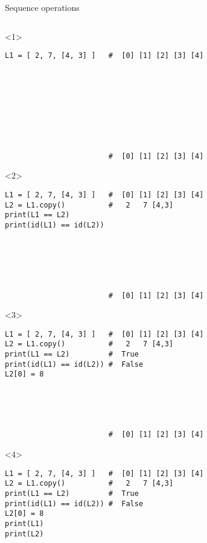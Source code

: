 \begin{frame}[fragile]{Sequence operations}

  \begin{center}

  \begin{columns}[onlytextwidth]
    \begin{column}{\textwidth}

      \begin{onlyenv}<1>
        \begin{lstlisting}[style=python,morekeywords={for, in, range, list}]
L1 = [ 2, 7, [4, 3] ]   #  [0] [1] [2] [3] [4]









                        #  [0] [1] [2] [3] [4] \end{lstlisting}
      \end{onlyenv}

      \begin{onlyenv}<2>
        \begin{lstlisting}[style=python,morekeywords={for, in, range, list}]
L1 = [ 2, 7, [4, 3] ]   #  [0] [1] [2] [3] [4]
L2 = L1.copy()          #   2   7 [4,3]
print(L1 == L2)
print(id(L1) == id(L2))






                        #  [0] [1] [2] [3] [4] \end{lstlisting}
      \end{onlyenv}

      \begin{onlyenv}<3>
        \begin{lstlisting}[style=python,morekeywords={for, in, range, list}]
L1 = [ 2, 7, [4, 3] ]   #  [0] [1] [2] [3] [4]
L2 = L1.copy()          #   2   7 [4,3]
print(L1 == L2)         #  True
print(id(L1) == id(L2)) #  False
L2[0] = 8





                        #  [0] [1] [2] [3] [4] \end{lstlisting}
      \end{onlyenv}

      \begin{onlyenv}<4>
        \begin{lstlisting}[style=python,morekeywords={for, in, range, list}]
L1 = [ 2, 7, [4, 3] ]   #  [0] [1] [2] [3] [4]
L2 = L1.copy()          #   2   7 [4,3]
print(L1 == L2)         #  True
print(id(L1) == id(L2)) #  False
L2[0] = 8
print(L1)
print(L2)




\end{lstlisting}
\end{onlyenv}
\end{column}
\end{columns}
\end{center}
\end{frame}
